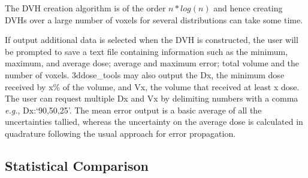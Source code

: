 \documentclass[12pt]{article}
\newcommand{\GUI}{3ddose\_tools}
\newcommand{\eg}{{\it e.g.}, }
\begin{document}
\begin{itemize}
  The DVH creation algorithm is of the order $n*log(n)$ and hence creating DVHs over a large number of voxels for several distributions can take some time.
  
  If output additional data is selected when the DVH is constructed, the user will be prompted to save a text file containing information such as the minimum, maximum, and average dose; average and maximum error; total volume and the number of voxels.  \GUI{} may also output the Dx, the minimum dose received by x\% of the volume, and Vx, the volume that received at least x dose.  The user can request multiple Dx and Vx by delimiting numbers with a comma \eg Dx:`90,50,25'.  The mean error output is a basic average of all the uncertainties tallied, whereas the uncertainty on the average dose is calculated in quadrature following the usual approach for error propagation.
  \end{itemize}

  
  \subsection{Statistical Comparison} 
  
\end{document}
